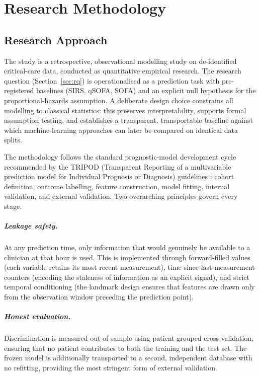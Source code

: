 \chapter{Research Methodology}
\label{ch:methodology}

\section{Research Approach}
The study is a retrospective, observational modelling study on de-identified
critical-care data, conducted as quantitative empirical research. The research
question (Section~\ref{sec:rq}) is operationalised as a prediction task with
pre-registered baselines (SIRS, qSOFA, SOFA) and an explicit null hypothesis for
the proportional-hazards assumption. A deliberate design choice constrains all
modelling to classical statistics: this preserves interpretability, supports
formal assumption testing, and establishes a transparent, transportable baseline
against which machine-learning approaches can later be compared on identical
data splits.

The methodology follows the standard prognostic-model development cycle
recommended by the TRIPOD (Transparent Reporting of a multivariable prediction
model for Individual Prognosis or Diagnosis) guidelines \cite{collins2015tripod}:
cohort definition,
outcome labelling, feature construction, model fitting, internal validation,
and external validation. Two overarching principles govern every stage.

\paragraph{Leakage safety.} At any prediction time, only information that
would genuinely be available to a clinician at that hour is used. This is
implemented through forward-filled values (each variable retains its most
recent measurement), time-since-last-measurement counters (encoding the
staleness of information as an explicit signal), and strict temporal
conditioning (the landmark design ensures that features are drawn only from
the observation window preceding the prediction point).

\paragraph{Honest evaluation.} Discrimination is measured out of sample using
patient-grouped cross-validation, ensuring that no patient contributes to both
the training and the test set. The frozen model is additionally transported to
a second, independent database with no refitting, providing the most stringent
form of external validation.

